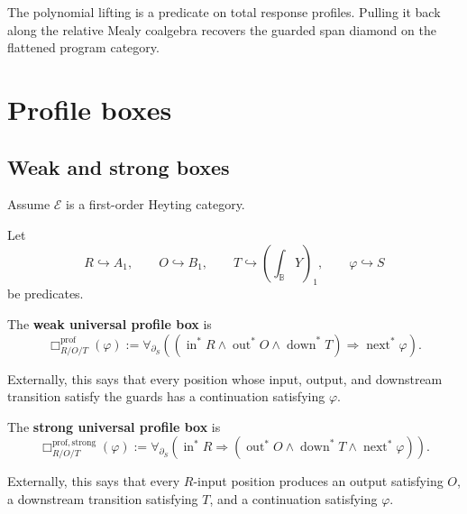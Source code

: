 \begin{remark}
\label{rem:poly-relative-central-comparison}
The polynomial lifting is a predicate on total response profiles.  Pulling it
back along the relative Mealy coalgebra recovers the guarded span diamond on
the flattened program category.
\end{remark}

\section{Profile boxes}
\label{sec:poly-relative-profile-boxes}

\subsection{Weak and strong boxes}
\label{subsec:poly-relative-weak-strong-boxes}

Assume \(\mathcal E\) is a first-order Heyting category.

Let
\[
R\hookrightarrow A_1,
\qquad
O\hookrightarrow B_1,
\qquad
T\hookrightarrow\left(\int_{\mathbb B}Y\right)_1,
\qquad
\varphi\hookrightarrow S
\]
be predicates.

\begin{definition}
\label{def:poly-relative-weak-profile-box}
The \textbf{weak universal profile box} is
\[
\Box^{\mathrm{prof}}_{R/O/T}(\varphi)
:=
\forall_{\partial_S}
\left(
(\operatorname{in}^{\ast}R
\wedge
\operatorname{out}^{\ast}O
\wedge
\operatorname{down}^{\ast}T)
\Rightarrow
\operatorname{next}^{\ast}\varphi
\right).
\]
\end{definition}

Externally, this says that every position whose input, output, and downstream
transition satisfy the guards has a continuation satisfying \(\varphi\).

\begin{definition}
\label{def:poly-relative-strong-profile-box}
The \textbf{strong universal profile box} is
\[
\Box^{\mathrm{prof,strong}}_{R/O/T}(\varphi)
:=
\forall_{\partial_S}
\left(
\operatorname{in}^{\ast}R
\Rightarrow
\left(
\operatorname{out}^{\ast}O
\wedge
\operatorname{down}^{\ast}T
\wedge
\operatorname{next}^{\ast}\varphi
\right)
\right).
\]
\end{definition}

Externally, this says that every \(R\)-input position produces an output
satisfying \(O\), a downstream transition satisfying \(T\), and a continuation
satisfying \(\varphi\).

